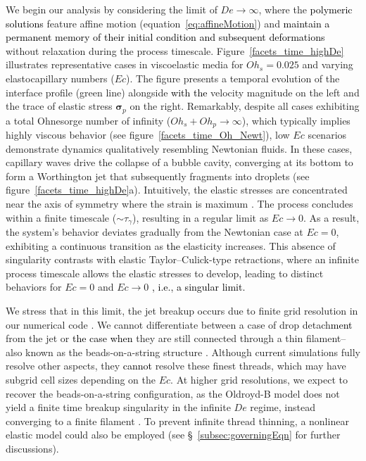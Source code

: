 \documentclass{jfm}
\newcommand{\DL}[1]{{\textcolor{black}{#1}}}
\newcommand{\VS}[1]{{\textcolor{black}{#1}}}
\begin{document}
We begin our analysis by considering the limit of $De \to \infty$, where the \DL{polymeric solutions} feature affine motion (equation~\eqref{eq:affineMotion}) and \VS{maintain a permanent memory of their initial condition and subsequent deformations} without relaxation during the process timescale.
Figure~\ref{facets_time_highDe} illustrates representative cases in viscoelastic media for $Oh_s = 0.025$ and varying elastocapillary numbers ($Ec$). The figure presents a temporal evolution of the interface profile (green line) alongside \DL{with the} velocity magnitude on the left and the trace of elastic stress $\boldsymbol{\sigma}_p$ on the right.
Remarkably, despite all cases exhibiting a total Ohnesorge number of infinity ($Oh_s + Oh_p \to \infty$), which typically implies highly viscous behavior (see figure~\ref{facets_time_Oh_Newt}), low $Ec$ scenarios demonstrate dynamics qualitatively resembling Newtonian fluids. In these cases, capillary waves drive the collapse of a bubble cavity, converging at its bottom to form a Worthington jet that subsequently fragments into droplets (see figure~\ref{facets_time_highDe}a). Intuitively, the elastic stresses are concentrated near the axis of symmetry where the strain is maximum \citep{turkoz2018axisymmetric,eggers2020self}.
The process concludes within a finite timescale ($\sim \tau_\gamma$), resulting in a regular limit as $Ec \to 0$. As a result, the system's behavior deviates gradually from the Newtonian case at $Ec = 0$, exhibiting a continuous transition as \DL{the} elasticity increases.
This absence of singularity contrasts with elastic Taylor--Culick-type retractions, where an infinite process timescale allows the elastic stresses to develop\DL{,} leading to distinct behaviors for $Ec = 0$ and $Ec \to 0$ \citep{BertinSanjay2024}\DL{, i.e., a singular limit.}

We stress that in this limit, the jet breakup occurs due to finite grid resolution in our numerical code \citep{lohse-2020-pnas,chirco2022manifold,kant2023bag}. We cannot differentiate between a case of drop detach\DL{ment} from the jet or \DL{the case when} they are still connected through a thin filament--also known as the beads-on-a-string structure \citep{hosokawa2023phase, clasen2006beads, pandey2021elastic, zinelis2023transition}. 
Although current simulations fully resolve other aspects, they \DL{cannot} resolve these finest threads, which may have subgrid cell sizes depending on the $Ec$.
At higher grid resolutions, we expect to recover the beads-on-a-string configuration, as the Oldroyd-B model does not yield a finite time breakup singularity in the infinite $De$ regime, instead converging to a finite filament \citep{eggers2020self,turkoz2018axisymmetric,turkoz2021simulation}.
To prevent infinite thread thinning, a nonlinear elastic model could also be employed (see \S~\ref{subsec:governingEqn} for further discussions).
\end{document}
